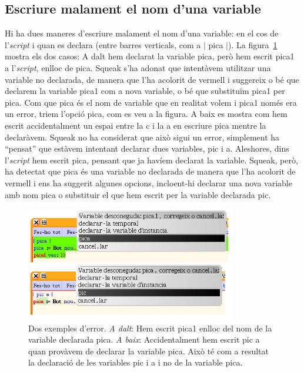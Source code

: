 \subsection{Escriure malament el nom d'una variable}
Hi ha dues maneres d'escriure malament el nom d'una variable: en el cos de l'\emph{script} i quan es declara (entre barres verticals, com a $|$ \textsf{pica} $|$). La figura~\ref{fig0206} mostra els dos casos: A dalt hem declarat la variable \textsf{pica}, però hem escrit \textsf{pica1} a l'\emph{script}, enlloc de \textsf{pica}. Squeak s'ha adonat que intentàvem utilitzar una variable no declarada, de manera que l'ha acolorit de vermell i suggereix o bé que declarem la variable \textsf{pica1} com a nova variable, o bé que substituïm \textsf{pica1} per \textsf{pica}. Com que \textsf{pica} és el nom de variable que en realitat volem i \textsf{pica1} només era un error, triem l'opció \textsf{pica}, com es veu a la figura. A baix es mostra com hem escrit accidentalment un espai entre la \textsf{c} i la \textsf{a} en escriure \textsf{pica} mentre la declaràvem. Squeak no ha considerat que això sigui un error, simplement ha ``pensat'' que estàvem intentant declarar dues variables, \textsf{pic} i \textsf{a}. Aleshores, dins l'\emph{script} hem escrit \textsf{pica}, pensant que ja havíem declarat la variable. Squeak, però, ha detectat que \textsf{pica} és una variable no declarada de manera que l'ha acolorit de vermell i ens ha suggerit algunes opcions, incloent-hi declarar una nova variable amb nom \textsf{pica} o substituir el que hem escrit per la variable declarada \textsf{pic}. 

\begin{figure}[h]
\begin{center}
\includegraphics[height=50mm ,width=92mm ]{Imatges/figura2-6.png}
\end{center}
\caption{Dos exemples d'error. \emph{A dalt}: Hem escrit \textsf{\upshape pica1} enlloc del nom de la variable declarada \textsf{\upshape pica}. \emph{A baix}: Accidentalment hem escrit \textsf{\upshape pic a} quan provàvem de declarar la variable \textsf{\upshape pica}. Això té com a resultat la declaració de les variables \textsf{\upshape pic} i \textsf{\upshape a} i no de la variable \textsf{\upshape pica}.}
\label{fig0206}
\end{figure}

